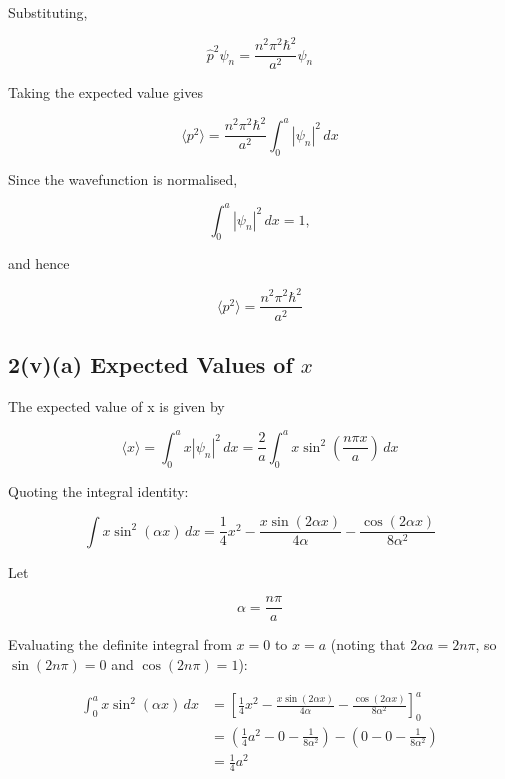 \documentclass{article}
\begin{document}
Substituting,

\begin{equation*}
\hat{p}^2\psi_n = \frac{n^2\pi^2\hbar^2}{a^2}\psi_n
\end{equation*}

Taking the expected value gives

\begin{equation*}
\langle p^2\rangle = \frac{n^2\pi^2\hbar^2}{a^2} \int_0^a|\psi_n|^2\,dx
\end{equation*}

Since the wavefunction is normalised,

\begin{equation*}
\int_0^a|\psi_n|^2\,dx=1,
\end{equation*}

and hence

\begin{equation*}
\boxed{ \langle p^2\rangle = \frac{n^2\pi^2\hbar^2}{a^2}}
\end{equation*}


\subsection*{2(v)(a) Expected Values of $x$}

The expected value of x is given by

\begin{equation*}
\langle x\rangle = \int_0^a x|\psi_n|^2\,dx = \frac{2}{a} \int_0^a x\sin^2\left(\frac{n\pi x}{a}\right)\,dx
\end{equation*}

Quoting the integral identity:

\begin{equation*}
\int x \sin^2(\alpha x) \, dx = \frac{1}{4}x^2 - \frac{x\sin(2\alpha x)}{4\alpha} - \frac{\cos(2\alpha x)}{8\alpha^2}
\end{equation*}

Let

\begin{equation*}
\alpha = \frac{n\pi}{a}
\end{equation*}

Evaluating the definite integral from $x = 0$ to $x = a$ (noting that $2\alpha a = 2n\pi$, so $\sin(2n\pi) = 0$ and $\cos(2n\pi) = 1$):

\begin{align}
\int_0^a x \sin^2(\alpha x) \, dx &= \left[ \frac{1}{4}x^2 - \frac{x\sin(2\alpha x)}{4\alpha} - \frac{\cos(2\alpha x)}{8\alpha^2} \right]_0^a \\
&= \left( \frac{1}{4}a^2 - 0 - \frac{1}{8\alpha^2} \right) - \left( 0 - 0 - \frac{1}{8\alpha^2} \right) \\
&= \frac{1}{4}a^2
\end{align}
\end{document}
